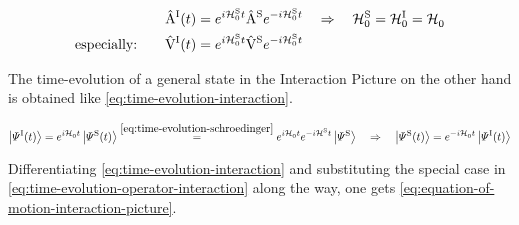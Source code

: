 \begin{equation}
    \label{eq:time-evolution-operator-interaction}
    \begin{split}
        \AopOfT[\interactionPicture] &= e^{i \HzeroHamiltonian[\schroedingerPicture]{} t} \Aop[\schroedingerPicture] e^{-i \HzeroHamiltonian[\schroedingerPicture]{} t}
        \quad \Rightarrow \quad 
        \HzeroHamiltonian[\schroedingerPicture]{} = \HzeroHamiltonian[\interactionPicture]{}= \HzeroHamiltonian[]{}\\
        \text{especially:} \qquad \VhamiltonianOfT[\interactionPicture] &=  e^{i \HzeroHamiltonian[\schroedingerPicture]{} t} \Vhamiltonian[\schroedingerPicture] e^{-i \HzeroHamiltonian[\schroedingerPicture]{} t}
    \end{split}
\end{equation}

The time-evolution of a general state in the Interaction Picture on the other hand is obtained like \autoref{eq:time-evolution-interaction}.

\begin{equation}
    \label{eq:time-evolution-interaction}
    \ketpsiof[\interactionPicture]{t} = e^{i \HzeroHamiltonian{} t} \ketpsiof[\schroedingerPicture]{t} \stackrel{\ref{eq:time-evolution-schroedinger}}{=} e^{i \HzeroHamiltonian{} t} e^{-i \pictureHamiltonian[\schroedingerPicture]{} t} \ketpsi[\schroedingerPicture]{} 
    \quad \Rightarrow \quad 
    \ketpsiof[\schroedingerPicture]{t} = e^{-i \HzeroHamiltonian{} t} \ketpsiof[\interactionPicture]{t}
\end{equation}

Differentiating \autoref{eq:time-evolution-interaction} and substituting the special case in \autoref{eq:time-evolution-operator-interaction} along the way, one gets \autoref{eq:equation-of-motion-interaction-picture}.

